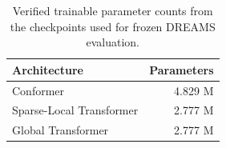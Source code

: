 \begin{table}[!t]
\centering
\caption{Verified trainable parameter counts from the checkpoints used for frozen DREAMS evaluation.}
\label{tab:model-parameters}
\footnotesize
\begin{tabular}{lr}
\toprule
Architecture & Parameters \\ 
\midrule
Conformer & 4.829 M \\ 
Sparse-Local Transformer & 2.777 M \\ 
Global Transformer & 2.777 M \\ 
\bottomrule
\end{tabular}
\end{table}

